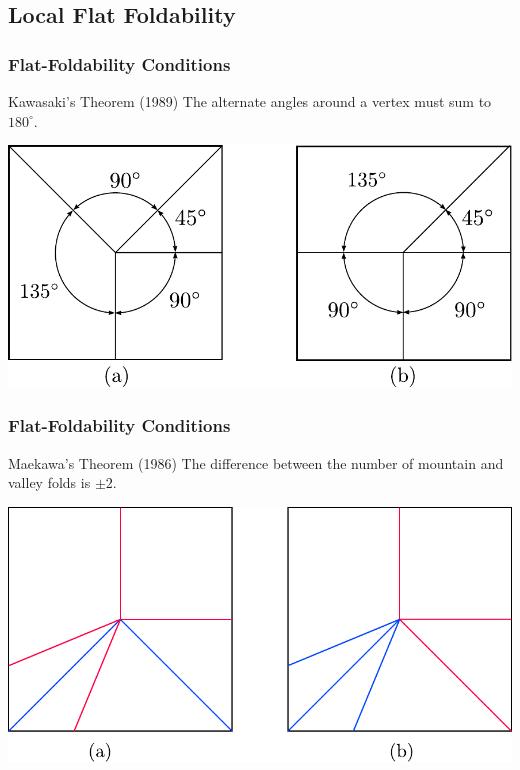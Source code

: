 \documentclass{beamer}
\begin{document}
\subsection{Local Flat Foldability}

\begin{frame}
\frametitle{Flat-Foldability Conditions}
\begin{block}{Kawasaki's Theorem (1989)}
The alternate angles around a vertex must sum to $180^\circ$.
\end{block}
\includegraphics[width=\textwidth]{foldability_pix/kawasaki_passfail.pdf}
\end{frame}


\begin{frame}
\frametitle{Flat-Foldability Conditions}
\begin{block}{Maekawa's Theorem (1986)}
The difference between the number of mountain and valley folds is $\pm 2$. 
\end{block}
\begin{center}
\includegraphics[width=.9\textwidth]{foldability_pix/maekawa_img.pdf}
\end{center}
\end{frame}
\end{document}
